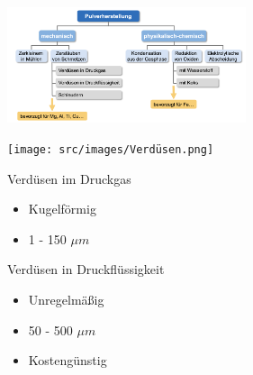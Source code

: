 \includegraphics[width = 70mm]{src/images/Pulverherstellung.png}

\texttt{[image: src/images/Verdüsen.png]}
\begin{minipage}{0.5\linewidth}
    Verdüsen im Druckgas
    \begin{tiny}
        \begin{itemize}
            \item Kugelförmig
            \item 1 - 150 $\mu m$
        \end{itemize}
    \end{tiny}
\end{minipage}
\begin{minipage}{0.5\linewidth}
    Verdüsen in Druckflüssigkeit
    \begin{tiny}
        \begin{itemize}
            \item Unregelmäßig
            \item 50 - 500 $\mu m$
            \item Kostengünstig
        \end{itemize}
    \end{tiny}
\end{minipage}

